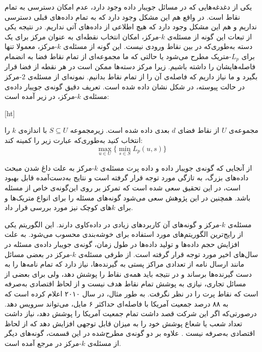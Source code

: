 یکی از دغدغه‌هایی که در مسائل جویبار داده وجود دارد، عدم امکان دسترسی به تمام نقاط است. در واقع هم این مشکل وجود دارد که به تمام داده‌های قبلی دسترسی نداریم و هم این مشکل وجود دارد که هیچ اطلاعی از داده‌های آتی نداریم. در نتیجه یکی از تبعات این گونه از‌ مسئله‌ی $k$-مرکز، امکان انتخاب نقطه‌ای به عنوان مرکز برای یک دسته به‌طوری‌که در بین نقاط ورودی نیست. این گونه از مسئله‌ی $k$-مرکز، معمولا تنها برای $L_p$-متریک مطرح می‌شود یا حالتی که ما مجموعه‌ای از تمام نقاط فضا به انضمام فاصله‌هایشان را داشته باشیم. زیرا مرکز دسته‌ها ممکن است در هر نقطه از فضا قرار بگیرد و ما نیاز داریم که فاصله‌ی آن را از تمام نقاط بدانیم. نمونه‌ای از مسئله‌ی $2$-مرکز در حالت پیوسته، در شکل‌  نشان داده شده است. تعریف دقیق گونه‌ی جویبار داده‌ی مسئله‌ی $k$‌-مرکز، در زیر آمده است:

[ht]

 مجموعه‌ی $U$ از نقاط فضای $d$ بعدی داده شده است. زیرمجموعه $S \subseteq U$ با اندازه‌ی $k$ را انتخاب کنید به‌طوری‌که عبارت زیر را کمینه کند:
$$\max_{u \in U} \{ \min_{s \in S} L_p(u, s) \}$$

از آنجایی که گونه‌ی جویبار داده و داده پرت مسئله‌ی $k$-مرکز به علت داغ شدن مبحث داده‌های بزرگ، به تازگی مورد توجه قرار گرفته است و نتایج به‌دست‌آمده قابل بهبود است، در این تحقیق سعی شده است که تمرکز بر روی این‌گونه‌ی خاص از مسئله باشد. همچنین در این پژوهش سعی می‌شود گونه‌های مسئله را برای انواع متریک‌ها و برای $k$های کوچک نیز مورد بررسی قرار داد. 


مسئله‌ی $k$-مرکز و گونه‌های آن کاربردهای زیادی در داده‌کاوی دارند. این الگوریتم یکی از رایج‌ترین الگوریتم‌های مورد استفاده برای خوشه‌بندی محسوب می‌شود. به علت افزایش حجم داده‌ها و تولید  داده‌ها در طول زمان، گونه‌ی جویبار داده‌ی مسئله در سال‌های اخیر مورد توجه قرار گرفته است. از طرفی مسئله‌ی $k$-مرکز در بعضی مسائل مانند ارسال نامه از‌ تعدادی مراکز پستی به گیرنده‌ها، نیاز دارد که تمام نامه‌ها را به دست گیرنده‌ها برساند و در نتیجه باید همه‌ی نقاط را پوشش دهد، ولی برای بعضی از مسائل تجاری، نیازی به پوشش تمام نقاط هدف نیست و از لحاظ اقتصادی به‌صرفه است که نقاط پرت را در نظر نگرفت. به طور مثال،  در سال ۲۰۱۰ اعلام کرده است که به ۸۸ درصد جمعیت آمریکا با فاصله‌ای حداکثر ۶ مایل، می‌تواند سرویس دهد. درصورتی‌که اگر این شرکت قصد داشت تمام جمعیت آمریکا را پوشش دهد، نیاز داشت تعداد شعب یا شعاع پوشش خود را به میزان قابل توجهی افزایش دهد که از لحاظ اقتصادی به‌صرفه نیست . علاوه بر دو گونه‌ی مطرح‌شده در این قسمت، گونه‌های دیگر از مسئله‌ی $k$-مرکز در مرجع  آمده است.

